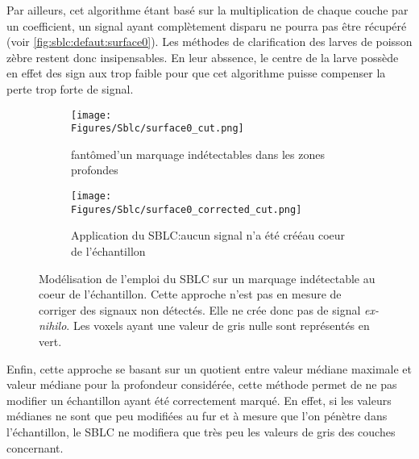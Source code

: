 \documentclass[\main/main.tex]{subfiles}
\begin{document}
%
Par ailleurs, cet algorithme étant basé sur la multiplication de chaque couche par
un coefficient, un signal ayant complètement disparu ne pourra pas être récupéré (voir \autoref{fig:sblc:defaut:surface0}). Les méthodes de clarification des larves de poisson zèbre restent donc insipensables. En leur abssence, le centre de la larve possède en effet des sign	aux trop faible pour que cet algorithme puisse compenser la perte trop forte de signal.
%
\begin{figure}[h!]
    \centering
    \begin{subfigure}[b]{0.45\textwidth}
        
        \caption{fantôme\newline d'un marquage indétectables dans les zones profondes}
        \centering \texttt{[image: \\Figures/Sblc/surface0\_cut.png]}
        \label{fig:sblc:defaut:surface0:application}
    \end{subfigure}
    \begin{subfigure}[b]{0.45\textwidth} 
        \caption{Application du SBLC:\newline aucun signal n'a été créé\newline au coeur de l'échantillon}
        \centering \texttt{[image: \\Figures/Sblc/surface0\_corrected\_cut.png]}
        \label{fig:sblc:defaut:surface0:application}
    \end{subfigure}
    \caption{
        Modélisation de l'emploi du SBLC sur un marquage indétectable au coeur de l'échantillon.
        \newline
        Cette approche n'est pas en mesure de corriger des signaux non détectés.
        Elle ne crée donc pas de signal \emph{ex\hyp{}nihilo}.
        \newline
        Les voxels ayant une valeur de gris nulle sont représentés en vert.
        }
    \label{fig:sblc:defaut:surface0}
\end{figure}

%
Enfin, cette approche se basant sur un quotient entre valeur médiane maximale et valeur médiane pour la profondeur considérée, cette méthode permet de ne pas modifier un échantillon ayant été correctement marqué.
%
En effet, si les valeurs médianes ne sont que peu modifiées au fur et à mesure que l'on pénètre dans l'échantillon, le SBLC ne modifiera que très peu les valeurs de gris des couches concernant.
\end{document}

